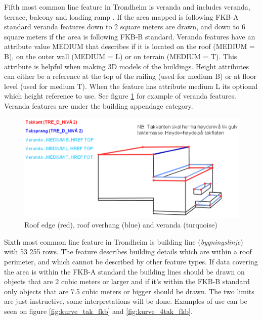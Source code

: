 Fifth most common line feature in Trondheim is veranda and includes veranda, terrace, balcony and loading ramp \cite{Kartverketb}. If the area mapped is following FKB-A standard veranda features down to 2 square meters are drawn, and down to 6 square meters if the area is following FKB-B standard. Veranda features have an attribute value MEDIUM that describes if it is located on the roof (MEDIUM = B), on the outer wall (MEDIUM = L) or on terrain (MEDIUM = T). This attribute is helpful when making 3D models of the buildings. Height attributes can either be a reference at the top of the railing (used for medium B) or at floor level (used for medium T). When the feature has attribute medium L its optional which height reference to use. See figure \ref{fig:veranda} for example of veranda features. Veranda features are under the building appendage category. 

\begin{figure}[H]
    \centering
    \includegraphics[scale=0.4]{figures/veranda_fkb.png}
    \caption{Roof edge (red), roof overhang (blue) and veranda (turquoise) \cite{Kartverket2013a}}
    \label{fig:veranda}
\end{figure} 

Sixth most common line feature in Trondheim is building line (\textit{bygningslinje}) with 53 255 rows. The feature describes building details which are within a roof perimeter, and which cannot be described by other feature types. If data covering the area is within the FKB-A standard %
the building lines should be drawn on objects that are 2 cubic meters or larger and if it's within the FKB-B standard only objects that are 7.5 cubic meters or bigger should be drawn. The two limits are just instructive, some interpretations will be done. Examples of use can be seen on figure \ref{fig:kurve_tak_fkb} and \ref{fig:kurve_4tak_fkb}. 

